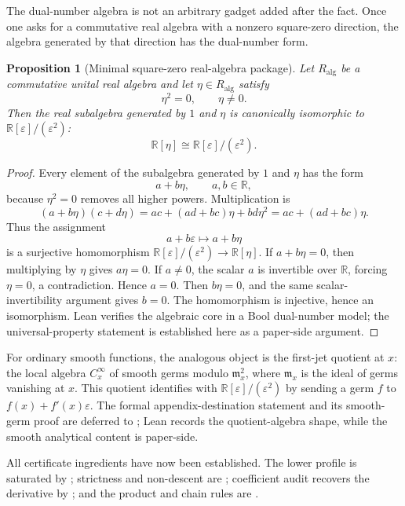 \documentclass[11pt]{article}
\newcommand{\R}{\mathbb R}
\newcommand{\Dual}{\R[\varepsilon]/(\varepsilon^2)}
\newtheorem{proposition}[theorem]{Proposition}
\theoremstyle{definition}
\begin{document}
The dual-number algebra is not an arbitrary gadget added after the fact.  Once
one asks for a commutative real algebra with a nonzero square-zero direction,
the algebra generated by that direction has the dual-number form.

\begin{proposition}[Minimal square-zero real-algebra package]
\label{prop:jet-minimal-square-zero-package}
Let \(R_{\mathrm{alg}}\) be a commutative unital real algebra and let \(\eta\in R_{\mathrm{alg}}\) satisfy
\[
\eta^2=0,
\qquad
\eta\neq 0.
\]
Then the real subalgebra generated by \(1\) and \(\eta\) is canonically isomorphic to \(\Dual\):
\[
\mathbb R[\eta]\cong \mathbb R[\varepsilon]/(\varepsilon^2).
\]
\end{proposition}

\begin{proof}
Every element of the subalgebra generated by \(1\) and \(\eta\) has the form
\[
a+b\eta,
\qquad
a,b\in\R,
\]
because \(\eta^2=0\) removes all higher powers.  Multiplication is
\[
(a+b\eta)(c+d\eta)
=ac+(ad+bc)\eta+bd\eta^2
=ac+(ad+bc)\eta.
\]
Thus the assignment
\[
a+b\varepsilon\longmapsto a+b\eta
\]
is a surjective homomorphism \(\Dual\to\R[\eta]\).  If \(a+b\eta=0\), then
multiplying by \(\eta\) gives \(a\eta=0\).  If \(a\neq 0\), the scalar \(a\) is
invertible over \(\R\), forcing \(\eta=0\), a contradiction.  Hence \(a=0\).
Then \(b\eta=0\), and the same scalar-invertibility argument gives \(b=0\).
The homomorphism is injective, hence an isomorphism.  Lean verifies the
algebraic core in a Bool dual-number model; the universal-property statement
is established here as a paper-side argument.
\end{proof}

For ordinary smooth functions, the analogous object is the first-jet quotient
at \(x\): the local algebra \(C^\infty_x\) of smooth germs modulo
\(\mathfrak m_x^2\), where \(\mathfrak m_x\) is the ideal of germs vanishing at
\(x\).  This quotient identifies with \(\Dual\) by sending a germ \(f\) to
\(f(x)+f'(x)\varepsilon\).  The formal appendix-destination statement and its
smooth-germ proof are deferred to ; Lean records the
quotient-algebra shape, while the smooth analytical content is paper-side.

All certificate ingredients have now been established.  The lower profile is
saturated by ; strictness and non-descent are
; coefficient
audit recovers the derivative by ;
and the product and chain rules are .
\end{document}
